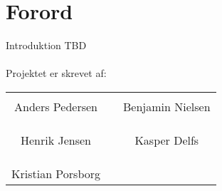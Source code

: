\chapter*{Forord}
Introduktion TBD
 \\\\


Projektet er skrevet af:\\
%
\phantom{Luft}\vspace{3cm}
\begin{table}[H]
	\centering
		\begin{tabular}{c c c}
			\underline{\phantom{JAERJAERJAERJAERGO}} & \phantom{cookies} & \underline{\phantom{JAERJAERJAERJAERGO}} \\
			Anders Pedersen			& \phantom{cookies} & Benjamin Nielsen		\\
			&&\\
			&&\\
			\underline{\phantom{JAERJAERJAERJAERGO}} & \phantom{cookies} & \underline{\phantom{JAERJAERJAERJAERGO}} \\
			Henrik Jensen			& \phantom{cookies} & Kasper Delfs		\\
			&&\\
			&&\\
	    \underline{\phantom{JAERJAERJAERJAERGO}} & \phantom{cookies} & \\
			Kristian Porsborg  					 
			&&\\							
		\end{tabular}
\end{table}